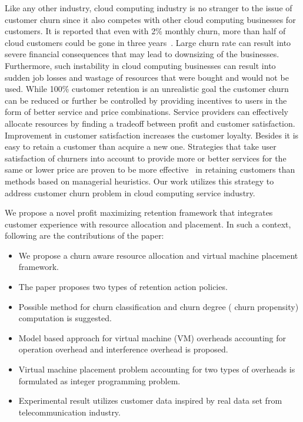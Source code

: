 Like any other industry, cloud computing industry is no stranger to the issue of customer churn since it also competes with other cloud computing businesses for customers.  It is reported that even with 2\% monthly churn, more than half of cloud customers could be gone in three years~\cite{cloudchurn2012}. Large churn rate can result into severe financial consequences that may lead to downsizing of the businesses. Furthermore, such instability in cloud computing businesses can result into sudden job losses and wastage of resources that were bought and would not be used. While 100\% customer retention is an unrealistic goal the customer churn can be reduced or further be controlled by providing incentives to users in the form of better service and price combinations.  Service providers can effectively allocate resources by finding a tradeoff between profit and customer satisfaction. Improvement in customer satisfaction increases the customer loyalty. Besides it is easy to retain a customer than acquire a new one. Strategies that take user satisfaction of churners into account to provide more or better services for the same or lower price are proven to be more effective~\cite{Burez2007277,6932875,TamaddoniJahromi20141258} in retaining customers than methods based on managerial heuristics. Our work utilizes this strategy to address customer churn problem in cloud computing service industry.  



We propose a novel profit maximizing retention framework that integrates customer experience with resource allocation and placement. In such a context, following are the contributions of the paper:
\begin{itemize}
	\item We propose a churn aware resource allocation and virtual machine placement framework.
\item The paper proposes two types of retention action policies.
	\item Possible method for churn classification and churn degree ( churn propensity) computation is suggested.
	\item Model based approach for virtual machine (VM) overheads accounting for operation overhead and interference overhead is proposed.
	\item Virtual machine placement problem accounting for two types of overheads is formulated as integer programming problem. 
	\item Experimental result utilizes customer data inspired by real data set from telecommunication industry.
\end{itemize}

